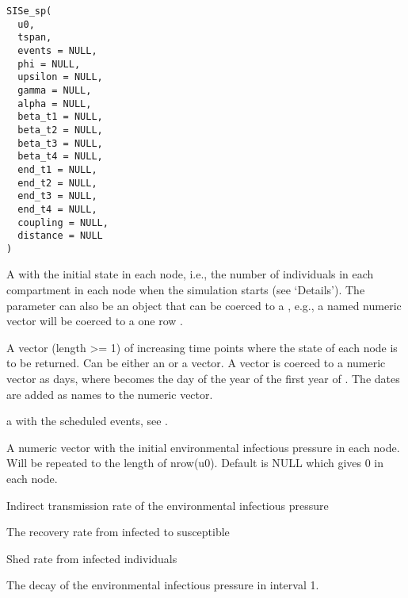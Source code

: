 \documentclass[letterpaper]{book}
\begin{document}
%
\begin{Usage}
\begin{verbatim}
SISe_sp(
  u0,
  tspan,
  events = NULL,
  phi = NULL,
  upsilon = NULL,
  gamma = NULL,
  alpha = NULL,
  beta_t1 = NULL,
  beta_t2 = NULL,
  beta_t3 = NULL,
  beta_t4 = NULL,
  end_t1 = NULL,
  end_t2 = NULL,
  end_t3 = NULL,
  end_t4 = NULL,
  coupling = NULL,
  distance = NULL
)
\end{verbatim}
\end{Usage}
%
\begin{Arguments}
\begin{ldescription}
\item[\code{u0}] A  with the initial state in each node,
i.e., the number of individuals in each compartment in each
node when the simulation starts (see `Details'). The
parameter  can also be an object that can be coerced
to a , e.g., a named numeric vector will be
coerced to a one row .

\item[\code{tspan}] A vector (length >= 1) of increasing time points
where the state of each node is to be returned. Can be either
an  or a  vector. A 
vector is coerced to a numeric vector as days, where
 becomes the day of the year of the first year
of . The dates are added as names to the numeric
vector.

\item[\code{events}] a  with the scheduled events, see
.

\item[\code{phi}] A numeric vector with the initial environmental
infectious pressure in each node. Will be repeated to the
length of nrow(u0). Default is NULL which gives 0 in each
node.

\item[\code{upsilon}] Indirect transmission rate of the environmental
infectious pressure

\item[\code{gamma}] The recovery rate from infected to susceptible

\item[\code{alpha}] Shed rate from infected individuals

\item[\code{beta\_t1}] The decay of the environmental infectious pressure
in interval 1.


\end{ldescription}
\end{Arguments}
\end{document}
